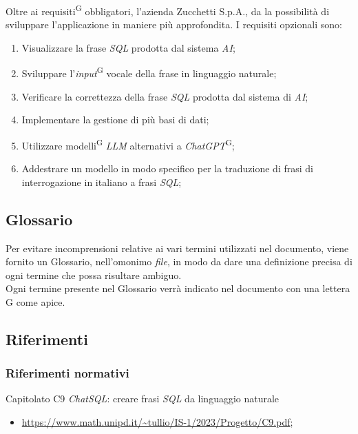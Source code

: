 \documentclass[5pt]{article}
\begin{document}
Oltre ai requisiti\textsuperscript{G} obbligatori, l'azienda Zucchetti S.p.A., da la possibilità di sviluppare l'applicazione in maniere più approfondita. I requisiti opzionali sono:
\begin{enumerate}
    \item Visualizzare la frase \textit{SQL} prodotta dal sistema \textit{AI};
    \item Sviluppare l'\textit{input}\textsuperscript{G} vocale della frase in linguaggio naturale;
    \item Verificare la correttezza della frase \textit{SQL} prodotta dal sistema di \textit{AI};
    \item Implementare la gestione di più basi di dati;
    \item Utilizzare modelli\textsuperscript{G} \textit{LLM} alternativi a \textit{ChatGPT}\textsuperscript{G};
    \item Addestrare un modello in modo specifico per la traduzione di frasi di interrogazione in italiano a frasi \textit{SQL};
\end{enumerate}

\subsection{Glossario}
Per evitare incomprensioni relative ai vari termini utilizzati nel documento, viene fornito un Glossario, nell'omonimo \textit{file}, in modo da dare una definizione precisa di ogni termine che possa risultare ambiguo.\\ Ogni termine presente nel Glossario verrà indicato nel documento con una lettera G come apice.

\subsection{Riferimenti}
\subsubsection{Riferimenti normativi}
Capitolato C9 \textit{ChatSQL}: creare frasi \textit{SQL} da linguaggio naturale
\begin{itemize}
    \item \url{https://www.math.unipd.it/~tullio/IS-1/2023/Progetto/C9.pdf};
\end{itemize}
\end{document}
